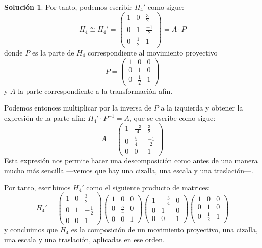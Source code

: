 \documentclass[a4paper, 11pt]{article}
\theoremstyle{definition}
\newtheorem*{solucion}{Solución}
\theoremstyle{theorem}
\begin{document}
\begin{solucion}
      Por tanto, podemos escribir $H_4'$ como sigue:
      \[
      H_4 \cong H_4' =
      \left(
      \begin{array}{ccc}
          1 & 0 & \frac{3}{2} \\
          0 & 1 & \frac{-1}{2} \\
          0 & \frac{1}{2} & 1
      \end{array}\right) = A\cdot P
      \]
      donde $P$ es la parte de $H_4$ correspondiente al movimiento proyectivo
      \[P =\begin{pmatrix}
          1 & 0 & 0 \\
          0 & 1 & 0 \\
          0 & \frac{1}{2} & 1
      \end{pmatrix}
      \]
      y $A$ la parte correspondiente a la transformación afín.

      Podemos entonces multiplicar por la inversa de $P$ a la izquierda y obtener la expresión de la parte afín: $H_4' \cdot P^{-1} = A$, que se escribe como sigue:
      \[
      A = \begin{pmatrix}
        1 & \frac{-3}{4} & \frac{3}{2} \\
        0 & \frac{5}{4} & \frac{-1}{2} \\
        0 & 0 & 1
      \end{pmatrix}
      \]
      Esta expresión nos permite hacer una descomposición como antes de una manera mucho más sencilla ---vemos que hay una cizalla, una escala y una traslación---.
      
      Por tanto, escribimos $H_4'$ como el siguiente producto de matrices:
      \[
          H_4' = \begin{pmatrix}
              1 & 0 & \frac{3}{2} \\
              0 & 1 & -\frac{1}{2} \\
              0 & 0 & 1
          \end{pmatrix}
          \begin{pmatrix}
              1 & 0 & 0 \\
              0 & \frac{5}{4} & 0 \\
              0 & 0 & 1
          \end{pmatrix}
          \begin{pmatrix}
              1 & -\frac{3}{4} & 0 \\
              0 & 1 & 0 \\
              0 & 0 & 1
          \end{pmatrix}
          \begin{pmatrix}
              1 & 0 & 0 \\
              0 & 1 & 0 \\
              0 & \frac{1}{2} & 1
          \end{pmatrix}
      \]
      y concluimos que $H_4$ es la composición de un movimiento proyectivo, una cizalla, una escala y una traslación, aplicadas en ese orden.
  \end{solucion}
\end{document}
